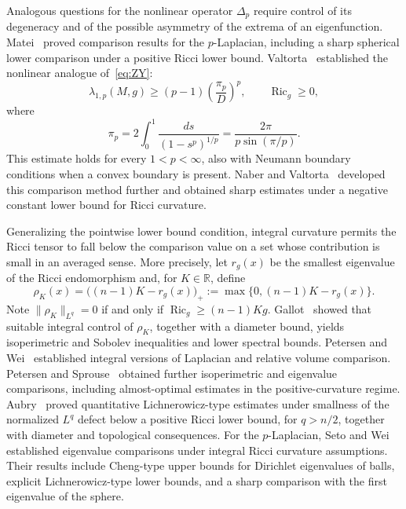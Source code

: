 \documentclass[11pt]{amsart}
\DeclareMathOperator{\Ric}{Ric}
\theoremstyle{definition}
\begin{document}
Analogous questions for the nonlinear operator $\Delta_p$ require control of its degeneracy and of the possible asymmetry of the extrema of an eigenfunction. Matei~\cite{Matei2000} proved comparison results for the $p$-Laplacian, including a sharp spherical lower comparison under a positive Ricci lower bound. Valtorta~\cite{Valtorta2012} established the nonlinear analogue of~\eqref{eq:ZY}:
\begin{equation}\label{eq:Valtorta}
 \lambda_{1,p}(M,g)\ge(p-1)\left(\frac{\pi_p}{D}\right)^p,
 \qquad \Ric_g\ge0,
\end{equation}
where
\begin{equation}\label{eq:pip}
 \pi_p=2\int_0^1\frac{ds}{(1-s^p)^{1/p}}
      =\frac{2\pi}{p\sin(\pi/p)}.
\end{equation}
This estimate holds for every $1<p<\infty$, also with Neumann boundary conditions when a convex boundary is present.  Naber and Valtorta~\cite{NaberValtorta2014} developed this comparison method further and obtained sharp estimates under a negative constant lower bound for Ricci curvature. 

Generalizing the pointwise lower bound condition, integral curvature permits the Ricci tensor to fall below the comparison value on a set whose contribution is small in an averaged sense. More precisely, let $r_g(x)$ be the smallest eigenvalue of the Ricci endomorphism and, for $K\in\mathbb R$, define
\[
 \rho_K(x)=\bigl((n-1)K-r_g(x)\bigr)_+:=\max\{0,(n-1)K-r_g(x)\}.
\]
Note $\|\rho_K\|_{L^q}=0$ if and only if $\Ric_g\ge(n-1)Kg$. Gallot~\cite{Gallot1988} showed that suitable integral control of $\rho_K$, together with a diameter bound, yields isoperimetric and Sobolev inequalities and lower spectral bounds. Petersen and Wei~\cite{PetersenWei1997} established integral versions of Laplacian and relative volume comparison. Petersen and Sprouse~\cite{PetersenSprouse1998} obtained further isoperimetric and eigenvalue comparisons, including almost-optimal estimates in the positive-curvature regime. Aubry~\cite{Aubry2007} proved quantitative Lichnerowicz-type estimates under smallness of the normalized $L^q$ defect below a positive Ricci lower bound, for $q>n/2$, together with diameter and topological consequences.  For the $p$-Laplacian, Seto and Wei~\cite{SetoWei2017} established eigenvalue comparisons under integral Ricci curvature assumptions. Their results include Cheng-type upper bounds for Dirichlet eigenvalues of balls, explicit Lichnerowicz-type lower bounds, and a sharp comparison with the first eigenvalue of the sphere.
\end{document}
